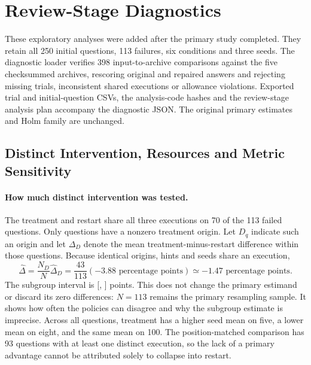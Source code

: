 \documentclass{article}
\begin{document}
\section{Review-Stage Diagnostics}
\label{app:review_diagnostics}
These exploratory analyses were added after the primary study completed.
They retain all 250 initial questions, 113 failures, six conditions and three
seeds. The diagnostic loader verifies 398 input-to-archive comparisons against
the five checksummed archives, rescoring original and repaired answers and
rejecting missing trials, inconsistent shared executions or allowance
violations. Exported trial and initial-question CSVs, the analysis-code
hashes and the review-stage analysis plan accompany the diagnostic JSON.
The original primary estimates and Holm family are unchanged.

\subsection{Distinct Intervention, Resources and Metric Sensitivity}
\label{app:review_overlap}
\paragraph{How much distinct intervention was tested.}
The treatment and restart share all three executions on 70 of the 113 failed
questions. Only \ReviewActiveQuestions{} questions have a nonzero treatment
origin. Let $D_q$ indicate such an origin and let $\Delta_D$ denote the
mean treatment-minus-restart difference within those questions. Because
identical origins, hints and seeds share an execution,
\begin{equation}
 \widehat\Delta=\frac{N_D}{N}\widehat\Delta_D
 =\frac{43}{113}(-3.88\text{ percentage points})
 \simeq -1.47\text{ percentage points}.
 \label{eq:overlap_decomposition}
\end{equation}
The subgroup interval is [\ReviewActiveLow{}, \ReviewActiveHigh{}] points.
This does not change the primary estimand or discard its zero differences:
$N=113$ remains the primary resampling sample. It shows how often the
policies can disagree and why the subgroup estimate is imprecise.
Across all questions, treatment has a higher seed mean on five, a lower mean
on eight, and the same mean on 100. The position-matched comparison has
93 questions with at least one distinct execution, so the lack of a primary
advantage cannot be attributed solely to collapse into restart.

\begin{table}[t]
\centering\footnotesize
\caption{Exploratory execution overlap with the treatment. Shared counts are
out of 339 question/seed pairs. Different-question counts are out of 113
questions with any distinct execution. Wins/losses/ties compare three-seed
question means, not independent seed trials.}
\label{tab:review_overlap}

\end{table}
\end{document}
